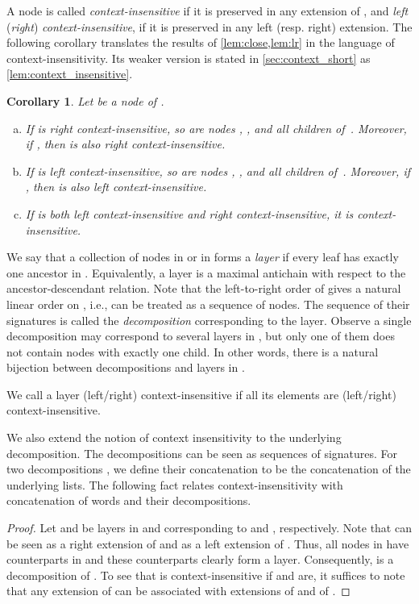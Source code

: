 \documentclass[a4paper]{article}
\newtheorem{corollary}[theorem]{Corollary}
\theoremstyle{remark}
\begin{document}
A node  is called \emph{context-insensitive} if it is preserved in any extension of ,
and \emph{left} (\emph{right}) \emph{context-insensitive}, if it is preserved in any left (resp. right) extension.
The following corollary translates the results of \cref{lem:close,lem:lr}
in the language of context-insensitivity. Its weaker version is stated in \cref{sec:context_short} as \cref{lem:context_insensitive}.

\begin{corollary}\label{cor:context_insensitive} Let  be a node of .
\begin{enumerate}[(a)]
\item\label{it:left} If  is right context-insensitive, so are nodes , , and all children of~.
Moreover, if , then  is also right context-insensitive.
\item\label{it:right} If  is left context-insensitive, so are nodes , , and all children of~.
Moreover, if , then  is also left context-insensitive.
\item\label{it:both} If  is both left context-insensitive and right context-insensitive, it is context-insensitive.
\end{enumerate}
\end{corollary}


We say that a collection  of nodes in  or in  forms a \emph{layer} if every leaf has exactly one ancestor in .
Equivalently, a layer is a maximal antichain with respect to the ancestor-descendant relation.
Note that the left-to-right order of  gives a natural linear order on , i.e.,  can be treated as a sequence of nodes.
The sequence of their signatures is called the \emph{decomposition} corresponding to the layer.
Observe a single decomposition may correspond to several layers in , but only one of them does not contain nodes with exactly one child.
In other words, there is a natural bijection between decompositions and layers in .

We call a layer (left/right) context-insensitive if all its elements are (left/right) context-insensitive.

We also extend the notion of context insensitivity to the underlying decomposition.
The decompositions can be seen as sequences of signatures.
For two decompositions ,  we define their concatenation  to be
the concatenation of the underlying lists.
The following fact relates context-insensitivity with concatenation of words and their decompositions.

\twodecompositions*


\begin{proof}
Let  and  be layers in  and  corresponding to  and , respectively.
Note that  can be seen as a right extension  of  and as a left extension  of .
Thus, all nodes in  have counterparts in  and these counterparts clearly form a layer.
Consequently,  is a decomposition of .
To see that  is context-insensitive if  and  are, it suffices to note that any extension 
of  can be associated with extensions  of  and  of .
\end{proof}
\end{document}
